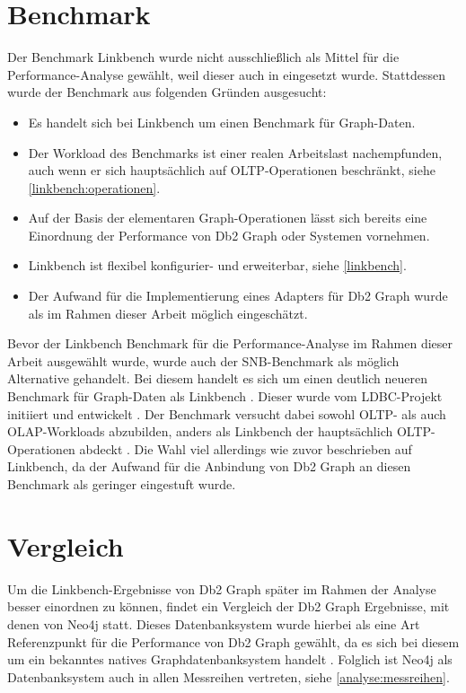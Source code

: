 \section{Benchmark}
\label{analyse:benchmark}
Der Benchmark Linkbench wurde nicht ausschließlich als Mittel für die Performance-Analyse gewählt, weil dieser auch in \cite{sigmod_tian} eingesetzt wurde. Stattdessen wurde der Benchmark aus folgenden Gründen ausgesucht:
\begin{itemize}
    \item Es handelt sich bei Linkbench um einen Benchmark für Graph-Daten.
    \item Der Workload des Benchmarks ist einer realen Arbeitslast nachempfunden, auch wenn er sich hauptsächlich auf OLTP-Operationen beschränkt, siehe \autoref{linkbench:operationen}. 
    \item Auf der Basis der elementaren Graph-Operationen lässt sich bereits eine Einordnung der Performance von Db2 Graph oder Systemen vornehmen. 
    \item Linkbench ist flexibel konfigurier- und erweiterbar, siehe \autoref{linkbench}. 
    \item Der Aufwand für die Implementierung eines Adapters für Db2 Graph wurde als im Rahmen dieser Arbeit möglich eingeschätzt.
\end{itemize}
Bevor der Linkbench Benchmark für die Performance-Analyse im Rahmen dieser Arbeit ausgewählt wurde, wurde auch der SNB-Benchmark als möglich Alternative gehandelt. Bei diesem  handelt es sich um einen deutlich neueren Benchmark für Graph-Daten als Linkbench \cite{snb_paper}. Dieser wurde vom LDBC-Projekt initiiert und entwickelt \cite{snb_paper}. Der Benchmark versucht dabei sowohl OLTP- als auch OLAP-Workloads abzubilden, anders als Linkbench der hauptsächlich OLTP-Operationen abdeckt \cite{snb_paper}. Die Wahl viel allerdings wie zuvor beschrieben auf Linkbench, da der Aufwand für die Anbindung von Db2 Graph an diesen Benchmark als geringer eingestuft wurde.  

\section{Vergleich}
\label{analyse:vergleich}
Um die Linkbench-Ergebnisse von Db2 Graph später im Rahmen der Analyse besser einordnen zu können, findet ein Vergleich der Db2 Graph Ergebnisse, mit denen von Neo4j statt. Dieses Datenbanksystem wurde hierbei als eine Art Referenzpunkt für die Performance von Db2 Graph gewählt, da es sich bei diesem um ein bekanntes natives Graphdatenbanksystem handelt \cite{gdbms}. Folglich ist Neo4j als Datenbanksystem auch in allen Messreihen vertreten, siehe \autoref{analyse:messreihen}.

